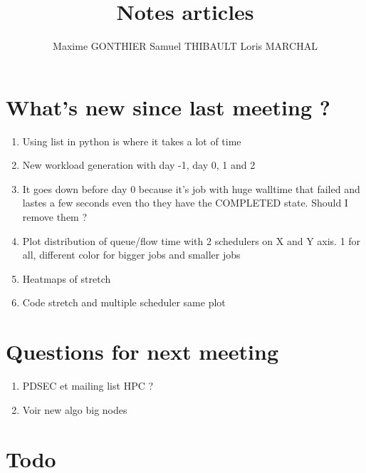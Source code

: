 \documentclass[a4paper]{article}
\title{Notes articles}
\author{Maxime GONTHIER Samuel THIBAULT Loris MARCHAL}
\begin{document}
\newpage

\section{What's new since last meeting ?}

	\begin{enumerate}
		\item Using list in python is where it takes a lot of time
		\item New workload generation with day -1, day 0, 1 and 2
		\item It goes down before day 0 because it's job with huge walltime that failed and lastes a few seconds even tho they have the COMPLETED state. Should I remove them ?
		\item Plot distribution of queue/flow time with 2 schedulers on X and Y axis. 1 for all, different color for bigger jobs and smaller jobs	
		\item Heatmaps of stretch
		\item Code stretch and multiple scheduler same plot
	\end{enumerate}
	
\section{Questions for next meeting}

	\begin{enumerate}
		\item PDSEC et mailing list HPC ?
		\item Voir new algo big nodes
	\end{enumerate}

\section{Todo}
\end{document}
